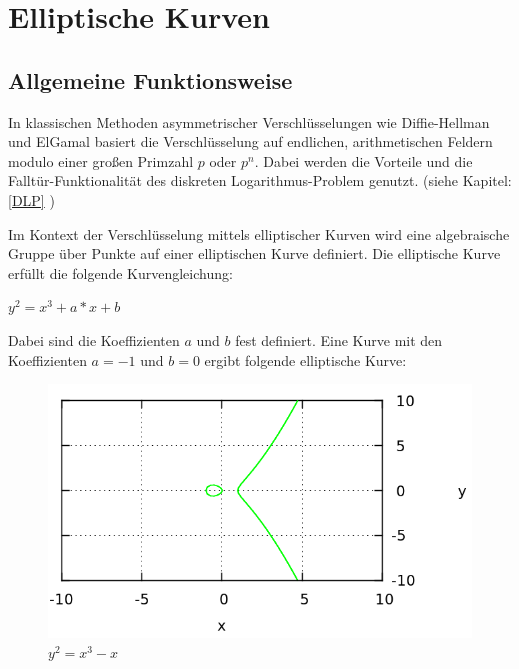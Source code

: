 
\chapter{Elliptische Kurven}

\section{Allgemeine Funktionsweise} \label{ECC_DLP}

In klassischen Methoden asymmetrischer Verschlüsselungen wie Diffie-Hellman und ElGamal basiert die
Verschlüsselung auf endlichen, arithmetischen Feldern modulo einer großen Primzahl $p$ oder $p^n$.
Dabei werden die Vorteile und die Falltür-Funktionalität des diskreten Logarithmus-Problem genutzt.
(siehe Kapitel: \ref{DLP} )

Im Kontext der Verschlüsselung mittels elliptischer Kurven wird eine algebraische Gruppe über Punkte
auf einer elliptischen Kurve definiert. 
Die elliptische Kurve erfüllt die folgende Kurvengleichung:

\begin{center}
$y^2 = x^3 + a*x + b$
\end{center}

Dabei sind die Koeffizienten $a$ und $b$ fest definiert.
Eine Kurve mit den Koeffizienten $a = -1$ und $b = 0$ ergibt folgende elliptische Kurve:

\begin{figure}[H]
	\begin{center}
		\includegraphics[keepaspectratio=true, scale=0.4]{./pictures/example_curve_1a.png}
	\end{center}
	\caption{$y^2 = x^3 -x$}\label{example_1}
\end{figure}

